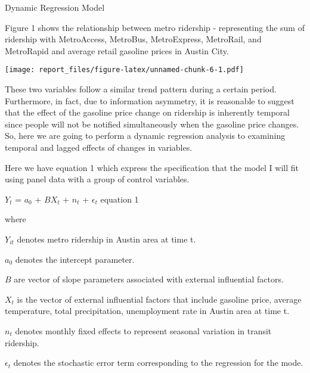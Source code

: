 \documentclass[]{article}
\begin{document}
Dynamic Regression Model

Figure 1 shows the relationship between metro ridership - representing
the sum of ridership with MetroAccess, MetroBus, MetroExpress,
MetroRail, and MetroRapid and average retail gasoline prices in Austin
City.

\texttt{[image: report\_files/figure-latex/unnamed-chunk-6-1.pdf]}

These two variables follow a similar trend pattern during a certain
period. Furthermore, in fact, due to information asymmetry, it is
reasonable to suggest that the effect of the gasoline price change on
ridership is inherently temporal since people will not be notified
simultaneously when the gasoline price changes. So, here we are going to
perform a dynamic regression analysis to examining temporal and lagged
effects of changes in variables.

Here we have equation 1 which express the specification that the model I
will fit using panel data with a group of control variables.

\({Y_{t}}\) = \({a_0}\) + \({B}\)\({X_{t}}\) + \({n_t}\) +
\(\epsilon_{t}\) equation 1

where

\({Y_{it}}\) denotes metro ridership in Austin area at time t.

\({a_0}\) denotes the intercept parameter.

\({B}\) are vector of slope parameters associated with external
influential factors.

\({X_t}\) is the vector of external influential factors that include
gasoline price, average temperature, total precipitation, unemployment
rate in Austin area at time t.

\({n_t}\) denotes monthly fixed effects to represent seasonal variation
in transit ridership.

\(\epsilon_{t}\) denotes the stochastic error term corresponding to the
regression for the mode.
\end{document}
